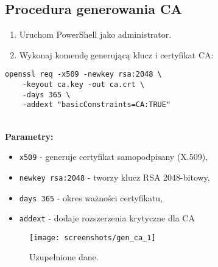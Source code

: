\documentclass{article}
\begin{document}
\subsection{Procedura generowania CA}
\begin{enumerate}
    \item Uruchom PowerShell jako administrator.
    \item Wykonaj komendę generującą klucz i certyfikat CA:
\end{enumerate}

\begin{lstlisting}[style=command, caption=Generowanie CA w PowerShell]
openssl req -x509 -newkey rsa:2048 \
    -keyout ca.key -out ca.crt \
    -days 365 \
    -addext "basicConstraints=CA:TRUE"
\end{lstlisting}

\noindent\textbf{\\Parametry:}
\begin{itemize}
    \item \texttt{x509} - generuje certyfikat samopodpisany (X.509),
    \item \texttt{newkey rsa:2048} - tworzy klucz RSA 2048-bitowy,
    \item \texttt{days 365} - okres ważności certyfikatu,
    \item \texttt{addext} - dodaje rozszerzenia krytyczne dla CA
\end{itemize}

\begin{figure}[H]
    \centering
    \texttt{[image: screenshots/gen\_ca\_1]}
    \caption{Uzupełnione dane.}
    \label{fig:gen_ca}
\end{figure}
\end{document}
